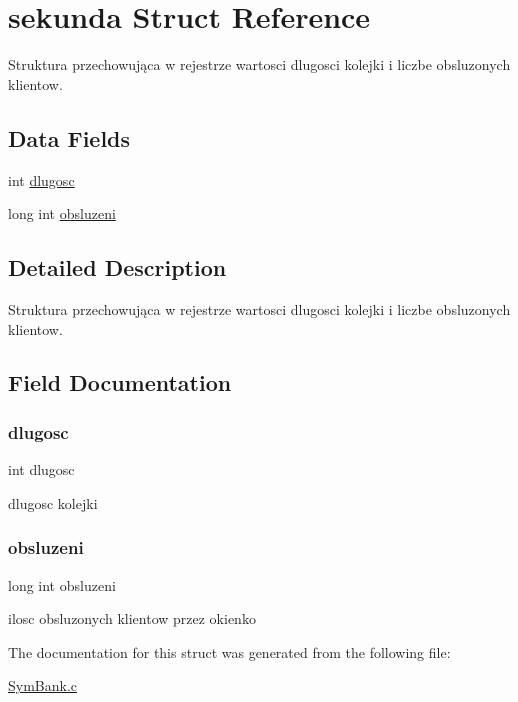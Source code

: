 \hypertarget{structsekunda}{}\section{sekunda Struct Reference}
\label{structsekunda}


Struktura przechowująca w rejestrze wartosci dlugosci kolejki i liczbe obsluzonych klientow.  


\subsection*{Data Fields}
\begin{DoxyCompactItemize}
\item 
int \hyperlink{structsekunda_a97085701621cb4ae96ca2b284fc4a830}{dlugosc}
\item 
long int \hyperlink{structsekunda_a48d269f5fbe53c9659dbb601b0db2aa2}{obsluzeni}
\end{DoxyCompactItemize}


\subsection{Detailed Description}
Struktura przechowująca w rejestrze wartosci dlugosci kolejki i liczbe obsluzonych klientow. 

\subsection{Field Documentation}
\mbox{\label{structsekunda_a97085701621cb4ae96ca2b284fc4a830}} 
\subsubsection{\texorpdfstring{dlugosc}{dlugosc}}
{\footnotesize\ttfamily int dlugosc}

dlugosc kolejki \mbox{\label{structsekunda_a48d269f5fbe53c9659dbb601b0db2aa2}} 
\subsubsection{\texorpdfstring{obsluzeni}{obsluzeni}}
{\footnotesize\ttfamily long int obsluzeni}

ilosc obsluzonych klientow przez okienko 

The documentation for this struct was generated from the following file\+:\begin{DoxyCompactItemize}
\item 
\hyperlink{_sym_bank_8c}{Sym\+Bank.\+c}\end{DoxyCompactItemize}
